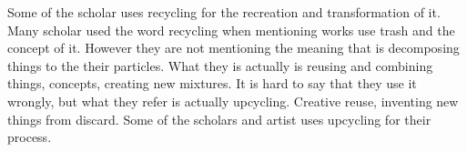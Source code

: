 Some of the scholar uses recycling \cite{cerny1996recycled,herman1998trashformations} for the recreation and transformation of it.  Many scholar used the word recycling when mentioning works use trash and the concept of it. However they are not mentioning the meaning that is decomposing things to the their particles. What they is actually is reusing and combining things, concepts, creating new mixtures. It is hard to say that they use it wrongly, but what they refer is actually upcycling. Creative reuse, inventing new things from discard.   Some of the scholars and artist uses upcycling for their process.  

